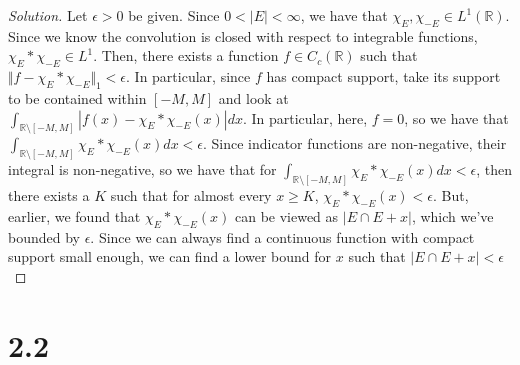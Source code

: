 \documentclass[10pt]{article}
\begin{document}
\begin{proof}[Solution]
Let $\epsilon > 0$ be given. Since $0 < |E| < \infty$, we have that $\chi_E, \chi_{-E} \in L^1(\mathbb{R})$. Since we know the convolution is closed with respect to integrable functions, $\chi_E \ast \chi_{-E} \in L^1$. Then, there exists a function $f \in C_c(\mathbb{R})$ such that $\Vert f - \chi_E \ast \chi_{-E} \Vert_1 < \epsilon$. In particular, since $f$ has compact support, take its support to be contained within $[-M,M]$ and look at $\int_{\mathbb{R} \setminus [-M,M]} |f(x) - \chi_E \ast \chi_{-E}(x)|dx$. In particular, here, $f = 0$, so we have that $\int_{\mathbb{R} \setminus [-M,M]} \chi_E \ast \chi_{-E}(x)dx < \epsilon$. Since indicator functions are non-negative, their integral is non-negative, so we have that for $\int_{\mathbb{R} \setminus [-M,M]} \chi_E \ast \chi_{-E}(x)dx < \epsilon$, then there exists a $K$ such that for almost every $x \geq K$, $\chi_E \ast \chi_{-E}(x) < \epsilon$. But, earlier, we found that $\chi_E \ast \chi_{-E}(x)$ can be viewed as $ |E \cap E + x|$, which we've bounded by $\epsilon$. Since we can always find a continuous function with compact support small enough, we can find a lower bound for $x$ such that  $ |E \cap E + x| < \epsilon$

\end{proof}

\section*{2.2}
\end{document}
